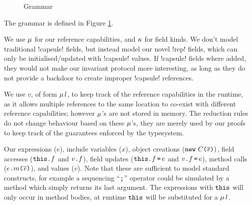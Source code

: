 \begin{figure}
\begin{grammatica}

		\\

		\\

		\\

		\\
		\\
	\end{grammatica}%
\caption{Grammar}\label{f:grammar}
\end{figure}

The grammar is defined in Figure \ref{f:grammar}.

We use $\mu$ for our reference capabilities, and $\kappa$ for field kinds. We don't model traditional \Q!capsule! fields, but instead model our novel \Q!rep! fields, which can only be initialised/updated with \Q!capsule! values. If \Q!capsule! fields where added, they would not make our invariant protocol more interesting, as long as they do not provide a backdoor to create improper \Q!capsule! references.

We use $v$, of form $\mu\,l$, to keep track of the reference capabilities in the runtime, as it allows multiple references to the same location to co-exist with different reference capabilities; however $\mu$'s are not stored in memory.
The reduction rules do not change behaviour based on these $\mu$'s, they are merely used by our proofs to keep track of the guarantees enforced by the typesystem.

Our expressions ($e$), include variables ($x$), object creations ($\texttt{new}\ C\texttt{(}\hspace{0.03ex} \overline{\hspace{-0.03ex}\mathit{e}\hspace{-0.03ex}} \hspace{0.03ex}\texttt{)})$, field accesses ($\texttt{this}\texttt{.} f$ and $v\texttt{.} f$), field updates ($\texttt{this}\texttt{.} f \,\texttt{=}\, e$ and $v\texttt{.} f \,\texttt{=}\, e$), method calls ($e\texttt{.} m\texttt{(}\hspace{0.03ex} \overline{\hspace{-0.03ex}\mathit{e}\hspace{-0.03ex}} \hspace{0.03ex}\texttt{)}$), and values ($v$). Note that these are sufficient to model standard constructs, for example a sequencing ``$\texttt{;}$'' operator could be simulated by a method which simply returns its last argument.
The expressions with $\texttt{this}$ will only occur in method bodies, at runtime $\texttt{this}$ will be substituted for a $\mu\,l$.

